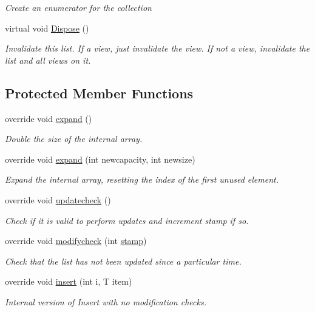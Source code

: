 \begin{DoxyCompactItemize}
\begin{DoxyCompactList}\small\item\em Create an enumerator for the collection \end{DoxyCompactList}\item 
virtual void \hyperlink{class_c5_1_1_hashed_array_list_aa8f55429bbf1b548fdb698740ea4d94c}{Dispose} ()
\begin{DoxyCompactList}\small\item\em Invalidate this list. If a view, just invalidate the view. If not a view, invalidate the list and all views on it. \end{DoxyCompactList}\end{DoxyCompactItemize}
\subsection*{Protected Member Functions}
\begin{DoxyCompactItemize}
\item 
override void \hyperlink{class_c5_1_1_hashed_array_list_a4dce92728aada5e2d56902d0565247ff}{expand} ()
\begin{DoxyCompactList}\small\item\em Double the size of the internal array. \end{DoxyCompactList}\item 
override void \hyperlink{class_c5_1_1_hashed_array_list_ae227e09958e8ce6eea7e0132ecd1a6aa}{expand} (int newcapacity, int newsize)
\begin{DoxyCompactList}\small\item\em Expand the internal array, resetting the index of the first unused element. \end{DoxyCompactList}\item 
override void \hyperlink{class_c5_1_1_hashed_array_list_a4a91454e022d105216e78756eff729c9}{updatecheck} ()
\begin{DoxyCompactList}\small\item\em Check if it is valid to perform updates and increment stamp if so. \end{DoxyCompactList}\item 
override void \hyperlink{class_c5_1_1_hashed_array_list_a0d8db9ef70c6d213b8c4f9302d9d1c15}{modifycheck} (int \hyperlink{class_c5_1_1_collection_base_ae13bd5b482306a49a4d10654a9b8b064}{stamp})
\begin{DoxyCompactList}\small\item\em Check that the list has not been updated since a particular time. \end{DoxyCompactList}\item 
override void \hyperlink{class_c5_1_1_hashed_array_list_a70d3534f5dcf4e6b4c041ffc58dbc830}{insert} (int i, T item)
\begin{DoxyCompactList}\small\item\em Internal version of Insert with no modification checks. \end{DoxyCompactList}\end{DoxyCompactItemize}
